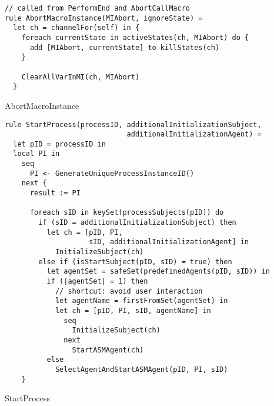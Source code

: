 \begin{listing}[H]
\begin{verbatim}
// called from PerformEnd and AbortCallMacro
rule AbortMacroInstance(MIAbort, ignoreState) =
  let ch = channelFor(self) in {
    foreach currentState in activeStates(ch, MIAbort) do {
      add [MIAbort, currentState] to killStates(ch)
    }

    ClearAllVarInMI(ch, MIAbort)
  }
\end{verbatim}
\caption{AbortMacroInstance}
\label{lst:asm:AbortMacroInstance}
\end{listing}



\begin{listing}[H]
\begin{verbatim}
rule StartProcess(processID, additionalInitializationSubject,
                             additionalInitializationAgent) =
  let pID = processID in
  local PI in
    seq
      PI <- GenerateUniqueProcessInstanceID()
    next {
      result := PI

      foreach sID in keySet(processSubjects(pID)) do
        if (sID = additionalInitializationSubject) then
          let ch = [pID, PI,
                    sID, additionalInitializationAgent] in
            InitializeSubject(ch)
        else if (isStartSubject(pID, sID) = true) then
          let agentSet = safeSet(predefinedAgents(pID, sID)) in
          if (|agentSet| = 1) then
            // shortcut: avoid user interaction
            let agentName = firstFromSet(agentSet) in
            let ch = [pID, PI, sID, agentName] in
              seq
                InitializeSubject(ch)
              next
                StartASMAgent(ch)
          else
            SelectAgentAndStartASMAgent(pID, PI, sID)
    }
\end{verbatim}
\caption{StartProcess}
\label{lst:asm:StartProcess}
\end{listing}


